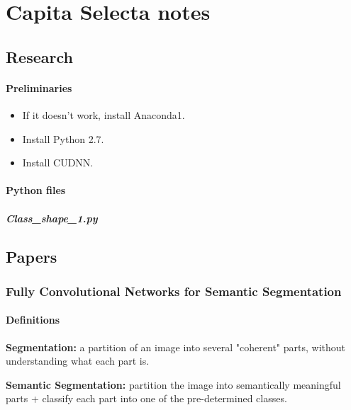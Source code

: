 \documentclass[]{article}
\date{}
\let\oldparagraph\paragraph
\renewcommand{\paragraph}[1]{\oldparagraph{#1}\mbox{}}
\let\oldsubparagraph\subparagraph
\renewcommand{\subparagraph}[1]{\oldsubparagraph{#1}\mbox{}}
\begin{document}
\section{Capita Selecta notes}\label{header-n3}

\tableofcontents

\subsection{Research}\label{header-n6}

\paragraph{Preliminaries}\label{header-n402}

\begin{itemize}
\item
  If it doesn't work, install Anaconda1.
\item
  Install Python 2.7.
\item
  Install CUDNN.
\end{itemize}

\paragraph{Python files}\label{header-n442}

\subparagraph{Class\_shape\_1.py}\label{header-n443}

\subsection{Papers}\label{header-n411}

\subsubsection{Fully Convolutional Networks for Semantic
Segmentation}\label{header-n10}

\paragraph{Definitions}\label{header-n11}

\textbf{Segmentation:} a partition of an image into several "coherent"
parts, without understanding what each part is.

\textbf{Semantic Segmentation:} partition the image into semantically
meaningful parts + classify each part into one of the pre-determined
classes.
\end{document}
